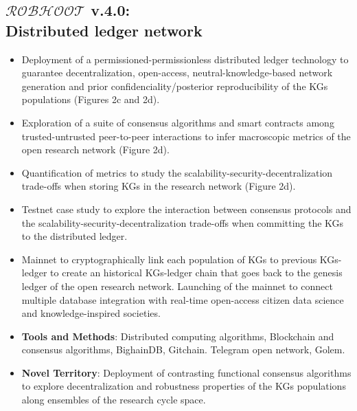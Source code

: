 \documentclass[12pt, a4paper]{article} %
\begin{document}
  \subsection{{\bf $\mathcal{ROBHOOT}$ v.4.0}: \\ Distributed ledger
    network}
  \begin{itemize}
  \item Deployment of a permissioned-permissionless distributed ledger
    technology to guarantee decentralization, open-access,
    neutral-knowledge-based network generation and prior
    confidenciality/posterior reproducibility of the KGs populations
    (Figures 2c and 2d).
  \item Exploration of a suite of consensus algorithms and smart
    contracts among trusted-untrusted peer-to-peer interactions to
    infer macroscopic metrics of the open research network (Figure
    2d).
  \item Quantification of metrics to study the
    scalability-security-decentralization trade-offs when storing KGs
    in the research network (Figure 2d).
  \item Testnet case study to explore the interaction between
    consensus protocols and the scalability-security-decentralization
    trade-offs when committing the KGs to the distributed ledger.
  \item Mainnet to cryptographically link each population of KGs to
    previous KGs-ledger to create an historical KGs-ledger chain that
    goes back to the genesis ledger of the open research
    network. Launching of the mainnet to connect multiple database
    integration with real-time open-access citizen data science and
    knowledge-inspired societies.
  \end{itemize}

   \begin{itemize}
   \item {\bf Tools and Methods}: Distributed computing algorithms,
     Blockchain and consensus algorithms, BighainDB,
     Gitchain. Telegram open network, Golem.
 \end{itemize}

 \begin{itemize}
 \item {\bf Novel Territory}: Deployment of contrasting functional
   consensus algorithms to explore decentralization and robustness
   properties of the KGs populations along ensembles of the research
   cycle space.
   \end{itemize}
  
\end{document}
